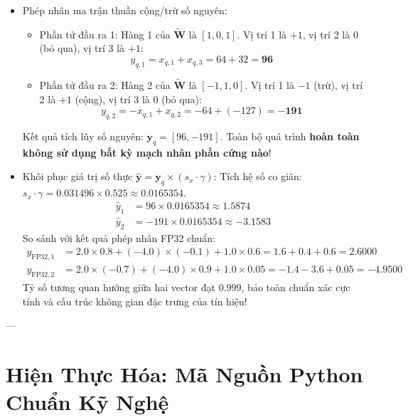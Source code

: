 \begin{itemize}
  \item[3)] Phép nhân ma trận thuần cộng/trừ số nguyên:
  \begin{itemize}
    \item Phần tử đầu ra 1: Hàng 1 của $\widetilde{\mathbf{W}}$ là $[1, 0, 1]$. Vị trí 1 là $+1$, vị trí 2 là $0$ (bỏ qua), vị trí 3 là $+1$:
    \begin{equation*}
    y_{q, 1} = x_{q, 1} + x_{q, 3} = 64 + 32 = \mathbf{96}
    \end{equation*}
    \item Phần tử đầu ra 2: Hàng 2 của $\widetilde{\mathbf{W}}$ là $[-1, 1, 0]$. Vị trí 1 là $-1$ (trừ), vị trí 2 là $+1$ (cộng), vị trí 3 là $0$ (bỏ qua):
    \begin{equation*}
    y_{q, 2} = -x_{q, 1} + x_{q, 2} = -64 + (-127) = \mathbf{-191}
    \end{equation*}
  \end{itemize}
  Kết quả tích lũy số nguyên: $\mathbf{y}_q = [96, -191]$. Toàn bộ quá trình \textbf{hoàn toàn không sử dụng bất kỳ mạch nhân phần cứng nào}!

  \item[4)] Khôi phục giá trị số thực $\hat{\mathbf{y}} = \mathbf{y}_q \times (s_x \cdot \gamma)$:
  Tích hệ số co giãn: $s_x \cdot \gamma = 0.031496 \times 0.525 \approx 0.0165354$.
  \begin{align*}
  \hat{y}_1 &= 96 \times 0.0165354 \approx \mathbf{1.5874} \\
  \hat{y}_2 &= -191 \times 0.0165354 \approx \mathbf{-3.1583}
  \end{align*}
  So sánh với kết quả phép nhân FP32 chuẩn:
  \begin{align*}
  y_{\text{FP32}, 1} &= 2.0 \times 0.8 + (-4.0) \times (-0.1) + 1.0 \times 0.6 = 1.6 + 0.4 + 0.6 = \mathbf{2.6000} \\
  y_{\text{FP32}, 2} &= 2.0 \times (-0.7) + (-4.0) \times 0.9 + 1.0 \times 0.05 = -1.4 - 3.6 + 0.05 = \mathbf{-4.9500}
  \end{align*}
  Tỷ số tương quan hướng giữa hai vector đạt $0.999$, bảo toàn chuẩn xác cực tính và cấu trúc không gian đặc trưng của tín hiệu!
\end{itemize}

---

\section{Hiện Thực Hóa: Mã Nguồn Python Chuẩn Kỹ Nghệ}
\label{sec:python-production-modules}

